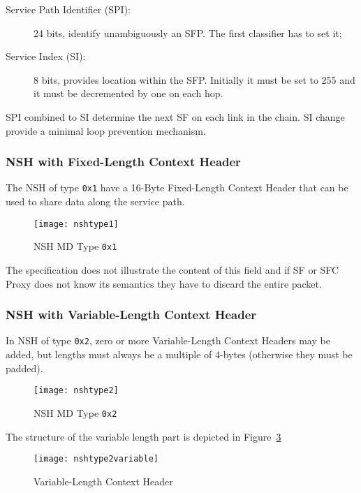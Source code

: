 \begin{description}
  \item[Service Path Identifier (SPI):] 24 bits, identify unambiguously an SFP.
  The first classifier has to set it;
  \item[Service Index (SI):] 8 bits, provides location within the SFP. Initially
  it must be set to 255 and it must be decremented by one on each hop.
\end{description}

SPI combined to SI determine the next SF on each link in the chain. SI change
provide a minimal loop prevention mechanism.

\subsubsection{NSH with Fixed-Length Context Header}
\label{subsubsec:background:flch}
The NSH of type \texttt{0x1} have a 16-Byte Fixed-Length Context Header that
can be used to share data along the service path.

\begin{figure}[H]
  \centering
  \texttt{[image: nshtype1]}
  \caption[NSH MD Type \texttt{0x1}]{NSH MD Type \texttt{0x1}~\cite{rfc8300}}
  \label{chap:background:img:nshtype1}
\end{figure}

The specification does not illustrate the content of this field and if SF or SFC
Proxy does not know its semantics they have to discard the entire packet. 

\subsubsection{NSH with Variable-Length Context Header}
\label{subsubsec:background:vlch}
In NSH of type \texttt{0x2}, zero or more Variable-Length Context Headers may
be added, but lengths must always be a multiple of 4-bytes (otherwise they must
be padded).

\begin{figure}[H]
  \centering
  \texttt{[image: nshtype2]}
  \caption[NSH MD Type \texttt{0x2}]{NSH MD Type \texttt{0x2}~\cite{rfc8300}}
  \label{chap:background:img:nshtype2}
\end{figure}

The structure of the variable length part is depicted in
Figure~\ref{chap:background:img:nshtype2variable}

\begin{figure}[H]
  \centering
  \texttt{[image: nshtype2variable]}
  \caption[Variable-Length Context Header]{Variable-Length Context
    Header~\cite{rfc8300}}
  \label{chap:background:img:nshtype2variable}
\end{figure}

